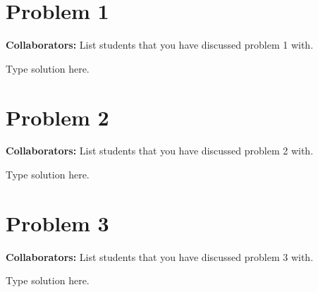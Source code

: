\documentclass[11pt,fleqn]{article}
\begin{document}
\maketitle

\renewcommand{\noanswer}[1]{#1}

% 
\section*{Problem 1}
\textbf{Collaborators:} List students that you have discussed problem 1 with.  

Type solution here. 

\section*{Problem 2}
\textbf{Collaborators:} List students that you have discussed problem 2 with.  

Type solution here. 

\section*{Problem 3}
\textbf{Collaborators:} List students that you have discussed problem 3 with.  

Type solution here. 
\end{document}
